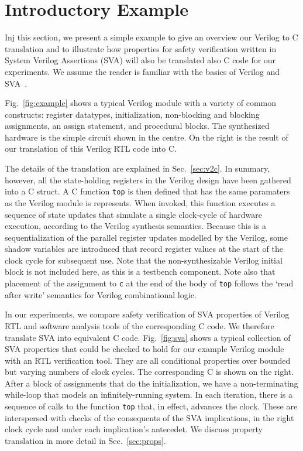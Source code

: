 \section{Introductory Example} 

Inj this section, we present a simple example to give an overview our Verilog to C translation and to illustrate how properties for safety verification written in System Verilog Assertions (SVA) will also be translated also C code for our experiments. We assume the reader is familiar with the basics of Verilog and SVA~\cite{verilog}. 

Fig.~\ref{fig:example} shows a typical Verilog module with a variety of common constructs: register datatypes, initialization, non-blocking and blocking assignments, an assign statement, and procedural blocks.  The synthesized hardware is the simple circuit shown in the centre.  On the right is the result of our translation of this Verilog RTL code into C.

The details of the translation are explained in Sec.~\ref{sec:v2c}. In summary, however, all the state-holding registers in the Verilog design have been gathered into a C struct. A C function \texttt{top} is then defined that has the same paramaters as the Verilog module is represents. When invoked, this function executes a sequence of state updates that simulate a single clock-cycle of hardware execution, according to the Verilog synthesis semantics. Because this is a sequentialization of the parallel register updates modelled by the Verilog, some shadow variables are introduced that record register values at the start of the clock cycle for subsequent use. Note that the non-synthesizable Verilog initial block is not included here, as this is a testbench component. Note also that placement of the assignment to \texttt{c} at the end of the body of \texttt{top} follows the `read after write' semantics for Verilog combinational logic.

In our experiments, we compare safety verification of SVA properties of Verilog RTL and software analysis tools of the corresponding C code. We therefore translate SVA into equivalent C code. Fig.~\ref{fig:sva} shows a typical collection of SVA properties that could be checked to hold for our example Verilog module with an RTL verification tool. They are all conditional properties over bounded but varying numbers of clock cycles. The corresponding C is shown on the right. After a block of assignments that do the initialization, we have a non-terminating while-loop that models an infinitely-running system. In each iteration, there is a sequence of calls to the function \texttt{top} that, in effect, advances the clock. These are interspersed with checks of the consequents of the SVA implications, in the right clock cycle and under each implication's antecedet. We discuss property translation in more detail in Sec.~\ref{sec:props}.

